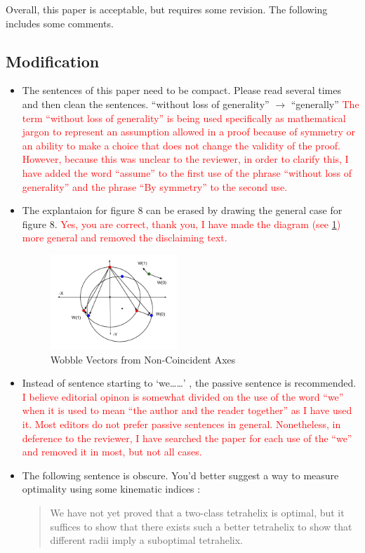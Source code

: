 \documentclass{article}
\newcommand{\highlighttext}[1] {\textcolor{red}{#1}}
\begin{document}
Overall, this paper is acceptable, but requires some revision. The following includes some comments.

\subsection{Modification}
\begin{itemize}
\item
The sentences of this paper need to be compact. Please read several times and then clean
the sentences.
``without loss of generality'' $\rightarrow$ ``generally''
\highlighttext{The term ``without loss of generality'' is being used specifically as mathematical jargon\cite{wiki:wolog} to represent an assumption allowed in a proof because of symmetry or an ability to make
  a choice that does not change the validity of the proof.
  However, because this was unclear to the reviewer, in order to clarify this, I have added the word ``assume'' to the first use of the phrase ``without loss of generality'' and the phrase ``By symmetry'' to the second use.
  }

\item
  The explantaion for figure 8 can be erased by drawing the general case for figure 8.
  \highlighttext{Yes, you are correct, thank you, I have made the diagram (see \cref{fig:wobble}) more general and removed the
    disclaiming text.}
    \begin{figure}
     \centering
     \includegraphics[width=0.45\textwidth]{figures/WobbleDiagram2.png}
     \caption{Wobble Vectors from Non-Coincident Axes}
  \label{fig:wobble}
\end{figure}
  \item
    Instead of sentence starting to ‘we……’ , the passive sentence is recommended.
    \highlighttext{
      I believe editorial opinon is somewhat divided\cite{firstperson} on the use of the word ``we'' when it is used to mean ``the author and the reader together'' as I have used it. Most editors do not prefer passive sentences in general.
      Nonetheless, in deference to the reviewer, I have searched the paper for each use of the ``we'' and
      removed it in most, but not all cases.
      }
    \item 
 The following sentence is obscure. You'd better suggest a way to measure optimality using
 some kinematic indices :
\begin{quote}
 We have not yet proved that a two-class tetrahelix is optimal, but it suffices to show
that there exists such a better tetrahelix to show that different radii imply a suboptimal
tetrahelix.
\end{quote}


\end{itemize}
\end{document}

